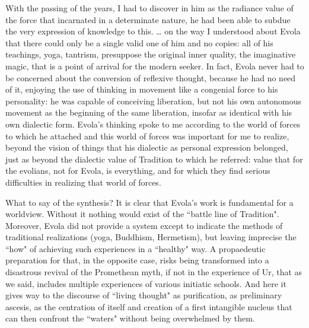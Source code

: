 \begin{quotex}
With the passing of the years, I had to discover in him as the radiance value of the force that incarnated in a determinate nature, he had been able to subdue the very expression of knowledge to this. … on the way I understood about Evola that there could only be a single valid one of him and no copies: all of his teachings, yoga, tantrism, presuppose the original inner quality, the imaginative magic, that is a point of arrival for the modern seeker. In fact, Evola never had to be concerned about the conversion of reflexive thought, because he had no need of it, enjoying the use of thinking in movement like a congenial force to his personality: he was capable of conceiving liberation, but not his own autonomous movement as the beginning of the same liberation, insofar as identical with his own dialectic form. Evola's thinking spoke to me according to the world of forces to which he attached and this world of forces was important for me to realize, beyond the vision of things that his dialectic as personal expression belonged, just as beyond the dialectic value of Tradition to which he referred: value that for the evolians, not for Evola, is everything, and for which they find serious difficulties in realizing that world of forces. 

\end{quotex}
What to say of the synthesis? It is clear that Evola's work is fundamental for a worldview. Without it nothing would exist of the ``battle line of Tradition". Moreover, Evola did not provide a system except to indicate the methods of traditional realizations (yoga, Buddhism, Hermetism), but leaving imprecise the ``how" of achieving such experiences in a ``healthy" way. A propaedeutic preparation for that, in the opposite case, risks being transformed into a disastrous revival of the Promethean myth, if not in the experience of Ur, that as we said, includes multiple experiences of various initiatic schools. And here it gives way to the discourse of ``living thought" as purification, as preliminary ascesis, as the centration of itself and creation of a first intangible nucleus that can then confront the ``waters" without being overwhelmed by them.


